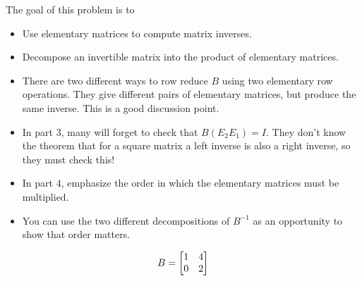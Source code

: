 \documentclass{problemset}
\newcommand{\bookonlynewpage}{\begin{bookonly}\newpage\end{bookonly}}
\begin{document}
	\bookonlynewpage
	\question
	\begin{annotation}
		\begin{goals}

			The goal of this problem is to
			\begin{itemize}
				\item Use elementary matrices to compute matrix inverses.
				\item Decompose an invertible matrix into the product of elementary matrices.
			\end{itemize}
		\end{goals}

		\begin{notes}
			\begin{itemize}
				\item There are two different ways to row reduce $B$ using two elementary row
					operations. They give different pairs of elementary matrices, but produce
					the same inverse. This is a good discussion point.
				\item In part 3, many will forget to check that $B(E_2E_1)=I$. They don't know
					the theorem that for a square matrix a left inverse is also a right inverse,
					so they must check this!
				\item In part 4, emphasize the order in which the elementary matrices must be multiplied.
				\item You can use the two different decompositions of $B^{-1}$ as an opportunity to
					show that order matters.
			\end{itemize}
		\end{notes}
	\end{annotation}
	\[
		B=\mat{1 &4\\0 &2}
	\]
\end{document}
